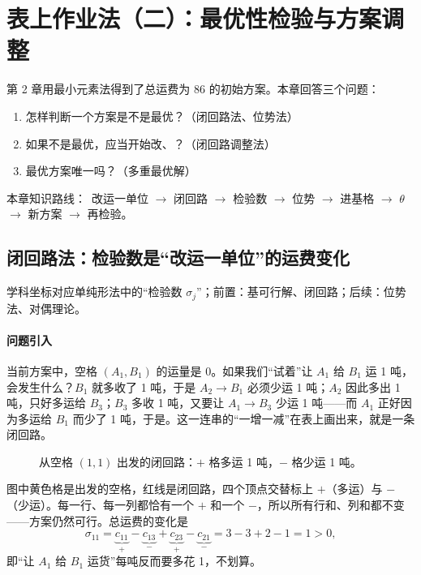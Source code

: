 \section{表上作业法（二）：最优性检验与方案调整}
\noindent 第 2 章用最小元素法得到了总运费为 86 的初始方案。本章回答三个问题：
\begin{enumerate}[label=\arabic*.]
\item 怎样判断一个方案是不是最优？（闭回路法、位势法）
\item 如果不是最优，应当开始改、？（闭回路调整法）
\item 最优方案唯一吗？（多重最优解）
\end{enumerate}
\noindent\textsf{\color{blue2}本章知识路线：}\ 改运一单位 $\to$ 闭回路 $\to$ 检验数 $\to$ 位势 $\to$ 进基格 $\to$ $\theta$ $\to$ 新方案 $\to$ 再检验。

\subsection{闭回路法：检验数是“改运一单位”的运费变化}
\noindent\textsf{\color{blue2}学科坐标}\quad 对应单纯形法中的“检验数 $\sigma_j$”；前置：基可行解、闭回路；后续：位势法、对偶理论。

\paragraph{问题引入}
当前方案中，空格 $(A_1,B_1)$ 的运量是 0。如果我们“试着”让 $A_1$ 给 $B_1$ 运 1 吨，会发生什么？$B_1$ 就多收了 1 吨，于是 $A_2\to B_1$ 必须少运 1 吨；$A_2$ 因此多出 1 吨，只好多运给 $B_3$；$B_3$ 多收 1 吨，又要让 $A_1\to B_3$ 少运 1 吨——而 $A_1$ 正好因为多运给 $B_1$ 而少了 1 吨，于是。这一连串的“一增一减”在表上画出来，就是一条闭回路。

\begin{figure}[H]
\centering
{}
\caption{从空格 $(1,1)$ 出发的闭回路：$+$ 格多运 1 吨，$-$ 格少运 1 吨。}\label{fig:loop11}
\end{figure}
图中黄色格是出发的空格，红线是闭回路，四个顶点交替标上 $+$（多运）与 $-$（少运）。每一行、每一列都恰有一个 $+$ 和一个 $-$，所以所有行和、列和都不变——方案仍然可行。总运费的变化是
\[
\sigma_{11}=\underbrace{c_{11}}_{+}-\underbrace{c_{13}}_{-}+\underbrace{c_{23}}_{+}-\underbrace{c_{21}}_{-}=3-3+2-1=1>0,
\]
即“让 $A_1$ 给 $B_1$ 运货”每吨反而要多花 1，不划算。

